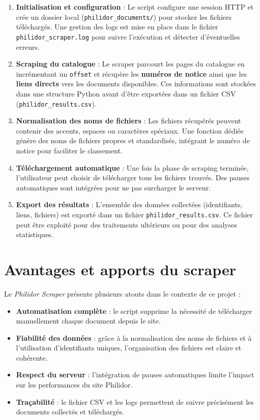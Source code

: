 \begin{enumerate}
    \item \textbf{Initialisation et configuration} :  
    Le script configure une session HTTP et crée un dossier local (\texttt{philidor\_documents/}) pour stocker les fichiers téléchargés.  
    Une gestion des logs est mise en place dans le fichier \texttt{philidor\_scraper.log} pour suivre l'exécution et détecter d'éventuelles erreurs.

    \item \textbf{Scraping du catalogue} :  
    Le scraper parcourt les pages du catalogue en incrémentant un \texttt{offset} et récupère les \textbf{numéros de notice} ainsi que les \textbf{liens directs} vers les documents disponibles.  
    Ces informations sont stockées dans une structure Python avant d'être exportées dans un fichier CSV (\texttt{philidor\_results.csv}).

    \item \textbf{Normalisation des noms de fichiers} :  
    Les fichiers récupérés peuvent contenir des accents, espaces ou caractères spéciaux.  
    Une fonction dédiée génère des noms de fichiers propres et standardisés, intégrant le numéro de notice pour faciliter le classement.

    \item \textbf{Téléchargement automatique} :  
    Une fois la phase de scraping terminée, l'utilisateur peut choisir de télécharger tous les fichiers trouvés.  
    Des pauses automatiques sont intégrées pour ne pas surcharger le serveur.

    \item \textbf{Export des résultats} :  
    L'ensemble des données collectées (identifiants, liens, fichiers) est exporté dans un fichier \texttt{philidor\_results.csv}.  
    Ce fichier peut être exploité pour des traitements ultérieurs ou pour des analyses statistiques.
\end{enumerate}

\section*{Avantages et apports du scraper}
Le \textit{Philidor Scraper} présente plusieurs atouts dans le contexte de ce projet :

\begin{itemize}
    \item \textbf{Automatisation complète} : le script supprime la nécessité de télécharger manuellement chaque document depuis le site.
    \item \textbf{Fiabilité des données} : grâce à la normalisation des noms de fichiers et à l'utilisation d'identifiants uniques, l'organisation des fichiers est claire et cohérente.
    \item \textbf{Respect du serveur} : l'intégration de pauses automatiques limite l'impact sur les performances du site Philidor.
    \item \textbf{Traçabilité} : le fichier CSV et les logs permettent de suivre précisément les documents collectés et téléchargés.
\end{itemize}


